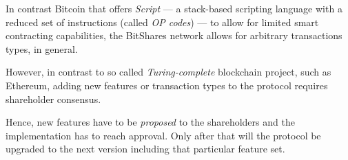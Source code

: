 In contrast Bitcoin that offers \emph{Script} --- a stack-based scripting
language with a reduced set of instructions (called \emph{OP codes}) --- to
allow for limited smart contracting capabilities, the BitShares network allows
for arbitrary transactions types, in general.

However, in contrast to so called \emph{Turing-complete} blockchain project,
such as Ethereum, adding new features or transaction types to the protocol
requires shareholder consensus.

Hence, new features have to be \emph{proposed} to the shareholders and the
implementation has to reach approval. Only after that will the protocol be
upgraded to the next version including that particular feature set.
